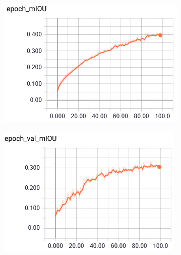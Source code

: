 \documentclass[conference]{IEEEtran}
\begin{document}
\begin{itemize}
\begin{figure}[htbp]
\begin{subfigure}[b]{0.23\textwidth}
 \centerline{\includegraphics[width=\textwidth]{training_miou_Unet_lr_1e-4.png}}
\end{subfigure}
\hfill\begin{subfigure}[b]{0.23\textwidth}
 \centerline{\includegraphics[width=\textwidth]{val_miou_Unet_lr_1e-4.png}}
\end{subfigure}


\end{figure}
\end{itemize}
\end{document}
